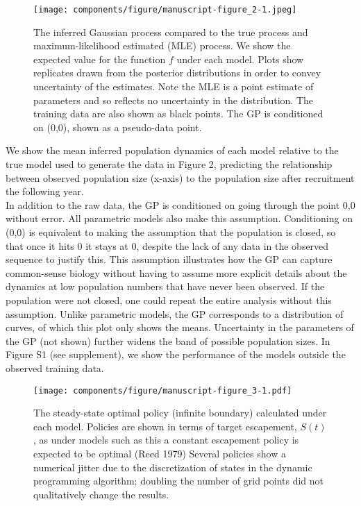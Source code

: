 \documentclass[author-year, 12pt,review]{components/elsarticle} %
\makeatletter
\def\maxwidth{\ifdim\Gin@nat@width>\linewidth\linewidth
\else\Gin@nat@width\fi}
\let\Oldincludegraphics\includegraphics
\renewcommand{\includegraphics}[1]{\Oldincludegraphics[width=\maxwidth]{#1}}
\makeatother
\begin{document}
\begin{figure}[htbp]
\centering
\texttt{[image: components/figure/manuscript-figure\_2-1.jpeg]}
\caption{The inferred Gaussian process compared to the true process and
maximum-likelihood estimated (MLE) process. We show the expected value
for the function $f$ under each model. Plots show replicates drawn from
the posterior distributions in order to convey uncertainty of the
estimates. Note the MLE is a point estimate of parameters and so
reflects no uncertainty in the distribution. The training data are also
shown as black points. The GP is conditioned on (0,0), shown as a
pseudo-data point.}
\end{figure}

We show the mean inferred population dynamics of each model relative to
the true model used to generate the data in Figure 2, predicting the
relationship between observed population size (x-axis) to the population
size after recruitment the following year.\\In addition to the raw data,
the GP is conditioned on going through the point 0,0 without error. All
parametric models also make this assumption. Conditioning on (0,0) is
equivalent to making the assumption that the population is closed, so
that once it hits 0 it stays at 0, despite the lack of any data in the
observed sequence to justify this. This assumption illustrates how the
GP can capture common-sense biology without having to assume more
explicit details about the dynamics at low population numbers that have
never been observed. If the population were not closed, one could repeat
the entire analysis without this assumption. Unlike parametric models,
the GP corresponds to a distribution of curves, of which this plot only
shows the means. Uncertainty in the parameters of the GP (not shown)
further widens the band of possible population sizes. In Figure S1 (see
supplement), we show the performance of the models outside the observed
training data.

\begin{figure}[htbp]
\centering
\texttt{[image: components/figure/manuscript-figure\_3-1.pdf]}
\caption{The steady-state optimal policy (infinite boundary) calculated
under each model. Policies are shown in terms of target escapement,
$S(t)$, as under models such as this a constant escapement policy is
expected to be optimal (Reed 1979) Several policies show a numerical
jitter due to the discretization of states in the dynamic programming
algorithm; doubling the number of grid points did not qualitatively
change the results.}
\end{figure}
\end{document}
